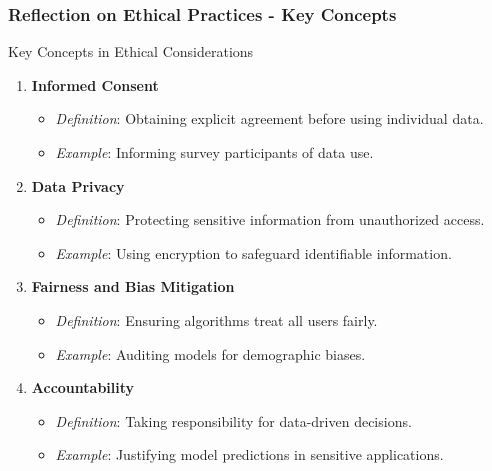 \documentclass[aspectratio=169]{beamer}
\begin{document}
\begin{frame}[fragile]
    \frametitle{Reflection on Ethical Practices - Key Concepts}
    \begin{block}{Key Concepts in Ethical Considerations}
        \begin{enumerate}
            \item \textbf{Informed Consent}
            \begin{itemize}
                \item \textit{Definition}: Obtaining explicit agreement before using individual data.
                \item \textit{Example}: Informing survey participants of data use.
            \end{itemize}
            
            \item \textbf{Data Privacy}
            \begin{itemize}
                \item \textit{Definition}: Protecting sensitive information from unauthorized access.
                \item \textit{Example}: Using encryption to safeguard identifiable information.
            \end{itemize}
            
            \item \textbf{Fairness and Bias Mitigation}
            \begin{itemize}
                \item \textit{Definition}: Ensuring algorithms treat all users fairly.
                \item \textit{Example}: Auditing models for demographic biases.
            \end{itemize}
            
            \item \textbf{Accountability}
            \begin{itemize}
                \item \textit{Definition}: Taking responsibility for data-driven decisions.
                \item \textit{Example}: Justifying model predictions in sensitive applications.
            \end{itemize}
        \end{enumerate}
    \end{block}
\end{frame}
\end{document}
